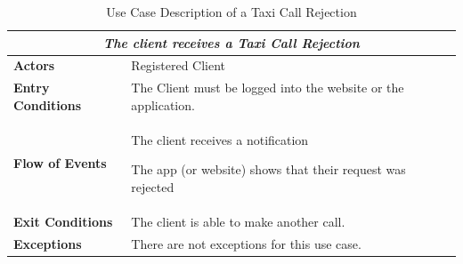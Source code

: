 \documentclass[a4paper]{article}
\begin{document}
\begin{table} [H]
\begin{center}
\begin{tabular}{ |m{}|m{}|  }
\hline
    \multicolumn{2}{|c|}{\textbf{\textit{The client receives a Taxi Call Rejection}}} \\
\hline \hline
    \textbf{Actors}
&   Registered Client
\\ \hline
    \textbf{Entry Conditions}
&   The Client must be logged into the website or the application.
\\ \hline
    \textbf{Flow of Events}
& 
    \begin{enumerate*}
    \item The client receives a notification
    \item The app (or website) shows that their request was rejected
    \end{enumerate*}
\\ \hline
    \textbf{Exit Conditions}
&   The client is able to make another call.
\\ \hline
    \textbf{Exceptions}
&   
    There are not exceptions for this use case.
\\ \hline
\end{tabular}
\end{center}
\caption{Use Case Description of a Taxi Call Rejection}
\label{table:clientrejection}
\end{table}
\end{document}
